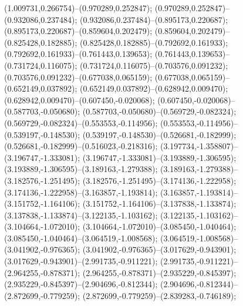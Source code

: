  (1.009731,0.266754)--(0.970289,0.252847);
 (0.970289,0.252847)--(0.932086,0.237484);
 (0.932086,0.237484)--(0.895173,0.220687);
 (0.895173,0.220687)--(0.859604,0.202479);
 (0.859604,0.202479)--(0.825428,0.182885);
 (0.825428,0.182885)--(0.792692,0.161933);
 (0.792692,0.161933)--(0.761443,0.139653);
 (0.761443,0.139653)--(0.731724,0.116075);
 (0.731724,0.116075)--(0.703576,0.091232);
 (0.703576,0.091232)--(0.677038,0.065159);
 (0.677038,0.065159)--(0.652149,0.037892);
 (0.652149,0.037892)--(0.628942,0.009470);
 (0.628942,0.009470)--(0.607450,-0.020068);
 (0.607450,-0.020068)--(0.587703,-0.050680);
 (0.587703,-0.050680)--(0.569729,-0.082324);
 (0.569729,-0.082324)--(0.553553,-0.114956);
 (0.553553,-0.114956)--(0.539197,-0.148530);
 (0.539197,-0.148530)--(0.526681,-0.182999);
 (0.526681,-0.182999)--(0.516023,-0.218316);
 (3.197734,-1.358807)--(3.196747,-1.333081);
 (3.196747,-1.333081)--(3.193889,-1.306595);
 (3.193889,-1.306595)--(3.189163,-1.279388);
 (3.189163,-1.279388)--(3.182576,-1.251495);
 (3.182576,-1.251495)--(3.174136,-1.222958);
 (3.174136,-1.222958)--(3.163857,-1.193814);
 (3.163857,-1.193814)--(3.151752,-1.164106);
 (3.151752,-1.164106)--(3.137838,-1.133874);
 (3.137838,-1.133874)--(3.122135,-1.103162);
 (3.122135,-1.103162)--(3.104664,-1.072010);
 (3.104664,-1.072010)--(3.085450,-1.040464);
 (3.085450,-1.040464)--(3.064519,-1.008568);
 (3.064519,-1.008568)--(3.041902,-0.976365);
 (3.041902,-0.976365)--(3.017629,-0.943901);
 (3.017629,-0.943901)--(2.991735,-0.911221);
 (2.991735,-0.911221)--(2.964255,-0.878371);
 (2.964255,-0.878371)--(2.935229,-0.845397);
 (2.935229,-0.845397)--(2.904696,-0.812344);
 (2.904696,-0.812344)--(2.872699,-0.779259);
 (2.872699,-0.779259)--(2.839283,-0.746189);
